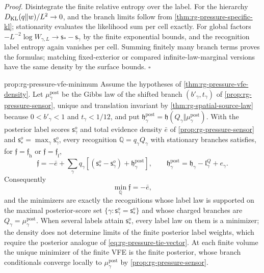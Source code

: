 \noindent\emph{Proof.}
Disintegrate the finite relative entropy over the label. For the hierarchy
$D_{\mathrm{KL}}(q\Vert w)/L^2\to0$, and the branch limits follow from
\cref{thm:rg-pressure-specific-kl}; stationarity evaluates the likelihood sum
per cell exactly. For global factors
$-L^{-2}\log W_{\gamma,L}\to\mathsf s_*-\mathsf s_\gamma$ by the finite
exponential bounds, and the recognition label entropy again vanishes per cell.
Summing finitely many branch terms proves the formulas; matching
fixed-exterior or compared infinite-law-marginal versions have the same
density by the surface bounds. $\square$

{prop:rg-pressure-vfe-minimum}
Assume the hypotheses of \cref{thm:rg-pressure-vfe-density}. Let
$\mu^{\mathrm{post}}_\gamma$ be the Gibbs law of the shifted branch
$(b'_\gamma,t_\gamma)$ of \cref{prop:rg-pressure-sensor}, unique and
translation invariant by \cref{thm:rg-spatial-source-law} because
$0<b'_\gamma<1$ and $t_\gamma<1/12$, and put
$\mathfrak h^{\mathrm{post}}_\gamma=\mathfrak h(Q_\gamma\Vert\mu^{\mathrm{post}}_\gamma)$.
With the posterior label scores $\mathsf s^o_\gamma$ and total evidence
density $\bar e$ of \cref{prop:rg-pressure-sensor} and
$\mathsf s^o_*=\max_\gamma\mathsf s^o_\gamma$, every recognition
$\mathbb Q=q_\gamma Q_\gamma$ with stationary branches satisfies, for
$\mathfrak f=\mathfrak f_{\mathrm h}$ or $\mathfrak f=\mathfrak f_{\mathrm f}$,
\begin{equation}
 \mathfrak f=-\bar e+\sum_\gamma q_\gamma
 \left[(\mathsf s^o_*-\mathsf s^o_\gamma)+\mathfrak h^{\mathrm{post}}_\gamma\right],
 \qquad
 \mathfrak h^{\mathrm{post}}_\gamma=\mathfrak h_\gamma-\mathfrak l^Q_\gamma+e_\gamma.
 \label{eq:rg-pressure-vfe-decomposition}
\end{equation}
Consequently
\begin{equation}
 \min_{\mathbb Q}\mathfrak f=-\bar e,
 \label{eq:rg-pressure-vfe-minimum}
\end{equation}
and the minimizers are exactly the recognitions whose label law is supported
on the maximal posterior-score set
$\{\gamma:\mathsf s^o_\gamma=\mathsf s^o_*\}$ and whose charged branches are
$Q_\gamma=\mu^{\mathrm{post}}_\gamma$. When several labels attain
$\mathsf s^o_*$, every label law on them is a minimizer; the density does not
determine limits of the finite posterior label weights, which require the
posterior analogue of \cref{eq:rg-pressure-tie-vector}. At each finite volume
the unique minimizer of the finite VFE is the finite posterior, whose branch
conditionals converge locally to $\mu^{\mathrm{post}}_\gamma$ by
\cref{prop:rg-pressure-sensor}. 

